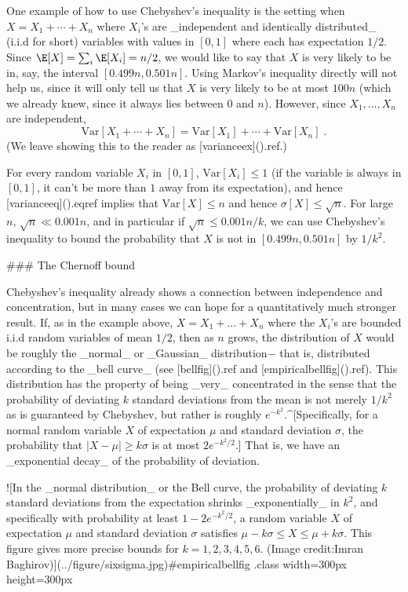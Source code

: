 One example of how to use Chebyshev's inequality is the setting when $X = X_1 + \cdots + X_n$ where $X_i$'s are _independent and identically distributed_ (i.i.d for short) variables with values in $[0,1]$ where each has  expectation $1/2$.
Since $\E[X] = \sum_i \E[X_i] = n/2$, we would like to say that $X$ is very likely to be in, say, the interval  $[0.499n,0.501n]$.
Using Markov's inequality directly will not help us, since it will only tell us that $X$ is very likely to be at most $100n$ (which we already knew, since it always lies between $0$ and $n$).
However,  since $X_1,\ldots,X_n$ are independent,
$$
\mathrm{Var}[X_1+\cdots +X_n] = \mathrm{Var}[X_1]+\cdots + \mathrm{Var}[X_n]  \label{varianceeq}\;.
$$
(We leave showing this to the reader as  [varianceex](){.ref}.)

For every random variable $X_i$ in $[0,1]$, $\mathrm{Var}[X_i] \leq 1$ (if the variable is always in $[0,1]$, it can't be more than $1$ away from its expectation), and hence [varianceeq](){.eqref} implies that $\mathrm{Var}[X]\leq n$ and hence $\sigma[X] \leq \sqrt{n}$.
For large $n$, $\sqrt{n} \ll 0.001n$, and in particular if $\sqrt{n} \leq 0.001n/k$,  we can use Chebyshev's inequality  to bound the probability that $X$ is not in $[0.499n,0.501n]$ by $1/k^2$.


### The Chernoff bound

Chebyshev's inequality already shows a connection between independence and concentration, but in many cases we can hope for a quantitatively much stronger result.
If, as in the example above, $X= X_1+\ldots+X_n$ where the $X_i$'s are  bounded i.i.d random variables of mean $1/2$, then as $n$ grows, the distribution of $X$ would be roughly the _normal_ or _Gaussian_ distribution$-$ that is, distributed according to  the  _bell curve_ (see [bellfig](){.ref} and [empiricalbellfig](){.ref}).
This distribution has the property of being _very_ concentrated in the sense that the probability of deviating $k$ standard deviations from the mean is not merely $1/k^2$ as is guaranteed by Chebyshev, but rather is roughly $e^{-k^2}$.^[Specifically, for a normal random variable $X$ of expectation $\mu$ and standard deviation $\sigma$, the probability that $|X-\mu| \geq k\sigma$ is at most $2e^{-k^2/2}$.]
That is, we have an _exponential decay_ of the probability of deviation.



![In the _normal distribution_ or the Bell curve, the probability of deviating $k$ standard deviations from the expectation shrinks _exponentially_ in $k^2$, and specifically with probability at least $1-2e^{-k^2/2}$,  a random variable $X$ of expectation $\mu$ and standard deviation $\sigma$ satisfies $\mu -k\sigma \leq X \leq \mu+k\sigma$. This figure  gives more precise bounds for $k=1,2,3,4,5,6$. (Image credit:Imran Baghirov)](../figure/sixsigma.jpg){#empiricalbellfig   .class width=300px height=300px}


